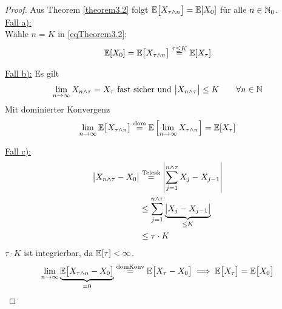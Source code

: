 \begin{proof}
Aus Theorem \ref{theorem3.2} folgt $\mathbb{E}\big[X_{\tau\wedge n}\big]=\mathbb{E}[X_0]$ für alle $n\in\mathbb{N}_0$.\\

\underline{Fall a):}\\
Wähle $n=K$ in \eqref{eqTheorem3.2}:
\begin{align*}
\mathbb{E}[X_0]=\mathbb{E}\big[X_{\tau\wedge n}\big]\stackrel{\tau\leq K}{=}\mathbb{E}[X_\tau]
\end{align*}

\underline{Fall b):} Es gilt
\begin{align*}
\lim\limits_{n\to\infty} X_{n\wedge\tau}=X_\tau\text{ fast sicher und }\big| X_{n\wedge\tau}\big|\leq K\qquad\forall n\in\mathbb{N}
\end{align*}
Mit dominierter Konvergenz
\begin{align*}
\lim\limits_{n\to\infty}\mathbb{E}\big[X_{\tau\wedge n}\big]\stackrel{\text{dom}}{=}\mathbb{E}\left[\lim\limits_{n\to\infty} X_{\tau\wedge n}\right]=\mathbb{E}[X_\tau]
\end{align*}

\underline{Fall c):}
\begin{align*}
\big| X_{n\wedge\tau}-X_0\big|
&\stackrel{\text{Telesk}}{=}
\left|\sum\limits_{j=1}^{n\wedge\tau} X_j-X_{j-1}\right|\\
&\leq\sum\limits_{j=1}^{n\wedge\tau} \underbrace{\big|X_j-X_{j-1}\big|}_{\leq K}\\
&\leq\tau\cdot K
\end{align*}
$\tau\cdot K$ ist integrierbar, da $\mathbb{E}[\tau]<\infty$.
\begin{align*}
\lim\limits_{n\to\infty}\underbrace{\mathbb{E}\big[X_{\tau\wedge n}-X_0\big]}_{=0}\stackrel{\text{domKonv}}{=}\mathbb{E}\big[X_\tau-X_0\big]
\implies
\mathbb{E}\big[X_\tau\big]=\mathbb{E}\big[X_0\big]
\end{align*}
\end{proof}

